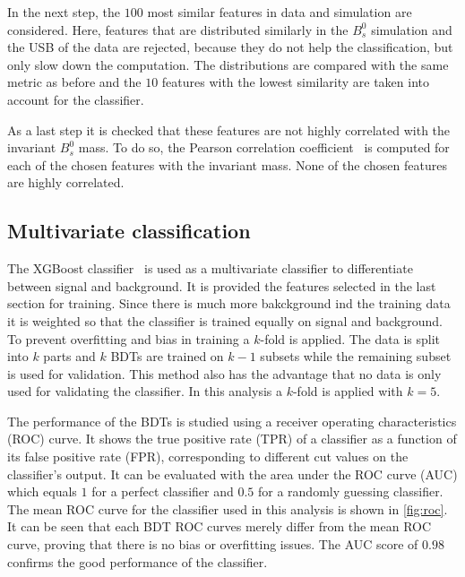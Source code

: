 In the next step, the $\num{100}$ most similar features in data and simulation are considered. Here, features that are distributed similarly in the $B^0_s$ simulation and the USB of the data are rejected, because they do not help the classification, but only slow down the computation. The distributions are compared with the same metric as before and the $\num{10}$ features with the lowest similarity are taken into account for the classifier.

As a last step it is checked that these features are not highly correlated with the invariant $B^0_s$ mass. To do so, the Pearson correlation coefficient~\cite{pearson} is computed for each of the chosen features with the invariant mass. None of the chosen features are highly correlated.

\subsection{Multivariate classification}
The XGBoost classifier~\cite{Chen:2016:XST:2939672.2939785} is used as a multivariate classifier to differentiate between signal and background. It is provided the features selected in the last section for training. Since there is much more bakckground ind the training data it is weighted so that the classifier is trained equally on signal and background. To prevent overfitting and bias in training a $k$-fold is applied. The data is split into $k$ parts and $k$ BDTs are trained on $k - 1$ subsets while the remaining subset is used for validation. This method also has the advantage that no data is only used for validating the classifier. In this analysis a $k$-fold is applied with $k = 5$.

The performance of the BDTs is studied using a receiver operating characteristics (ROC) curve. It shows the true positive rate (TPR) of a classifier as a function of its false positive rate (FPR), corresponding to different cut values on the classifier's output. It can be evaluated with the area under the ROC curve (AUC) which equals $1$ for a perfect classifier and $0.5$ for a randomly guessing classifier. The mean ROC curve for the classifier used in this analysis is shown in \autoref{fig:roc}. It can be seen that each BDT ROC curves merely differ from the mean ROC curve, proving that there is no bias or overfitting issues. The AUC score of $\num{0.98}$ confirms the good performance of the classifier.


